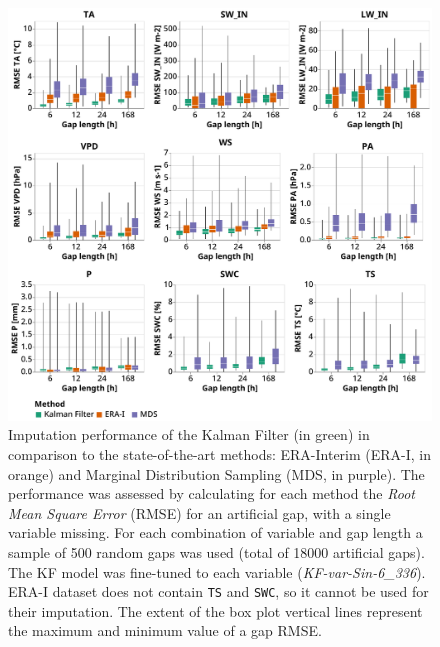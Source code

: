\documentclass{article}
\newcommand{\imgwidth}{6in}
\begin{document}
\begin{figure}
    \centerline{\includegraphics[width=\imgwidth]{the_plot}}
\caption{ Imputation performance of the Kalman Filter (in green) in comparison to the state-of-the-art methods: ERA-Interim (ERA-I, in orange) and Marginal Distribution Sampling (MDS, in purple). The performance was assessed by calculating for each method the \textit{Root Mean Square Error} (RMSE) for an artificial gap, with a single variable missing. For each combination of variable and gap length a sample of 500 random gaps was used (total of 18000 artificial gaps).
The KF model was fine-tuned to each variable (\textit{KF-\textlangle var\textrangle-Sin-6\_336}). ERA-I dataset does not contain \texttt{TS} and \texttt{SWC}, so it cannot be used for their imputation. The extent of the box plot vertical lines represent the maximum and minimum value of a gap RMSE.}
\label{fig:the_plot}
\end{figure}

\newcommand{\CapTheTable}{Imputation performance of the Kalman filter in comparison to the state-of-the-art
methods: ERA-Interim (ERA-I) and Marginal Distribution Sampling (MDS), using mean and standard deviation of the \textit{Root Mean Square Error} (RMSE). The best method for each gap length is highlighted in bold. For each combination of gap length and variable, 500 artificial gaps were created.}

\end{document}
